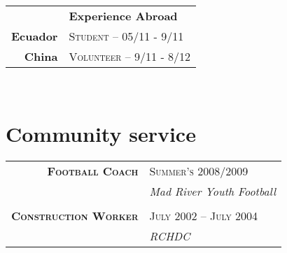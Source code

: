 \documentclass[10pt]{article} %
\begin{document}
{\begin{minipage}[t]{0.44\textwidth}
\begin{tabular}{rl}
&\textbf{Experience Abroad}\\


 \textbf{Ecuador} & \textsc{Student} -- 05/11 - 9/11 \\


 \textbf{ China} & \textsc{Volunteer} -- 9/11 - 8/12 \\


\end{tabular}\\[5pt]


\section{Community service}

\begin{tabular}{rl}
{\raggedleft\par}
\textbf{\textsc{  Football Coach}}&\textsc{Summer's  2008/2009}\\
&\textit{Mad River Youth Football}\\\\
\textbf{\textsc{Construction Worker}}&\textsc{July 2002 -- July 2004}\\
&\textit{RCHDC}\\
\end{tabular}\\[10pt]



\end{minipage}}
\end{document}
